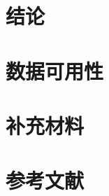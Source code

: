 \documentclass[12pt,a4paper]{ctexart}
\begin{document}
\section{结论}
\label{sec:conclusion}


\section*{数据可用性}


\section*{补充材料}


\section*{参考文献}

\end{document}
